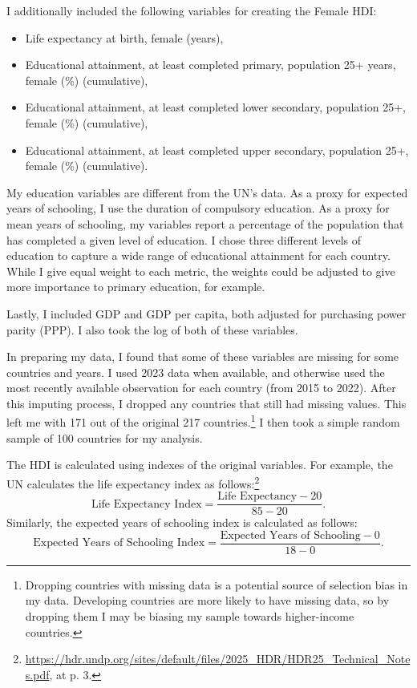 \documentclass[12pt]{article}
\begin{document}
I additionally included the following variables for creating the Female HDI:
\begin{itemize}
    \singlespace
    \item Life expectancy at birth, female (years),
    \item Educational attainment, at least completed primary, population 25+ years, female (\%) (cumulative),
    \item Educational attainment, at least completed lower secondary, population 25+, female (\%) (cumulative),
    \item Educational attainment, at least completed upper secondary, population 25+, female (\%) (cumulative).
\end{itemize}

My education variables are different from the UN's data. As a proxy for expected years of schooling, I use the duration of compulsory education. As a proxy for mean years of schooling, my variables report a percentage of the population that has completed a given level of education. I chose three different levels of education to capture a wide range of educational attainment for each country. While I give equal weight to each metric, the weights could be adjusted to give more importance to primary education, for example.

Lastly, I included GDP and GDP per capita, both adjusted for purchasing power parity (PPP). I also took the log of both of these variables.

In preparing my data, I found that some of these variables are missing for some countries and years. I used 2023 data when available, and otherwise used the most recently available observation for each country (from 2015 to 2022). After this imputing process, I dropped any countries that still had missing values. This left me with 171 out of the original 217 countries.\footnote{Dropping countries with missing data is a potential source of selection bias in my data. Developing countries are more likely to have missing data, so by dropping them I may be biasing my sample towards higher-income countries.} I then took a simple random sample of 100 countries for my analysis.

The HDI is calculated using indexes of the original variables. For example, the UN calculates the life expectancy index as follows:\footnote{\url{https://hdr.undp.org/sites/default/files/2025_HDR/HDR25_Technical_Notes.pdf}, at p. 3.}
$$\text{Life Expectancy Index} = \frac{\text{Life Expectancy} - 20}{85 - 20}.$$
Similarly, the expected years of schooling index is calculated as follows:
$$\text{Expected Years of Schooling Index} = \frac{\text{Expected Years of Schooling} - 0}{18 - 0}.$$
\end{document}

